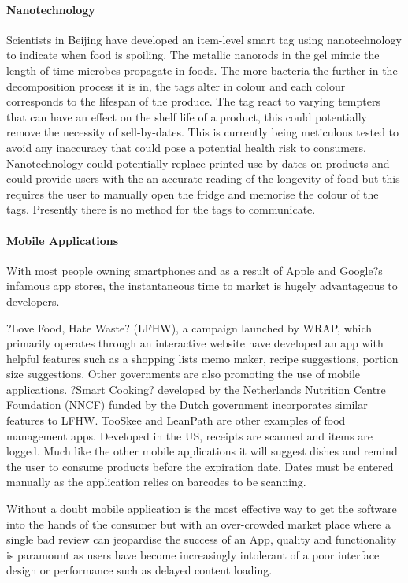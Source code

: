 \documentclass[a4paper, 11pt]{article}
\begin{document}
\paragraph{Nanotechnology}
Scientists in Beijing have developed an item-level smart tag using nanotechnology to indicate when food is spoiling. The metallic nanorods in the gel mimic the length of time microbes propagate in foods. The more bacteria the further in the decomposition process it is in, the tags alter in colour and each colour corresponds to the lifespan of the produce. The tag react to varying tempters that can have an effect on the shelf life of a product, this could potentially remove the necessity of sell-by-dates. This is currently being meticulous tested to avoid any inaccuracy that could pose a potential health risk to consumers. Nanotechnology could potentially replace printed use-by-dates on products and could provide users with the an accurate reading of the longevity of food but this requires the user to manually open the fridge and memorise the colour of the tags. Presently there is no method for the tags to communicate.

\paragraph{Mobile Applications}
With most people owning smartphones and as a result of Apple and Google?s infamous app stores, the instantaneous time to market is hugely advantageous to developers. 

?Love Food, Hate Waste? (LFHW), a campaign launched by WRAP, which primarily operates through an interactive website have developed an app with helpful features such as a shopping lists memo maker, recipe suggestions, portion size suggestions. Other governments are also promoting the use of mobile applications. ?Smart Cooking? developed by the Netherlands Nutrition Centre Foundation (NNCF) funded by the Dutch government incorporates similar features to LFHW. TooSkee and LeanPath are other examples of food management apps. Developed in the US, receipts are scanned and items are logged. Much like the other mobile applications it will suggest dishes and remind the user to consume products before the expiration date. Dates must be entered manually as the application relies on barcodes to be scanning. 

Without a doubt mobile application is the most effective way to get the software into the hands of the consumer but with an over-crowded market place where a single bad review can jeopardise the success of an App, quality and functionality is paramount as users have become increasingly intolerant of a poor interface design or performance such as delayed content loading.
\end{document}
